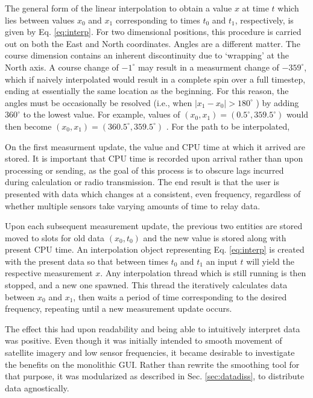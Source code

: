 \documentclass[12pt]{report}
\begin{document}
The general form of the linear interpolation to obtain a value $x$ at time $t$ which lies between values $x_0$ and $x_1$ corresponding to times $t_0$ and $t_1$, respectively, is given by Eq. \ref{eq:interp}.
For two dimensional positions, this procedure is carried out on both the East and North coordinates. 
Angles are a different matter. The course dimension contains an inherent discontinuity due to `wrapping' at the North axis. A course change of $-1^\circ$ may result in a measurment change of $-359^\circ$, which if naively interpolated would result in a complete spin over a full timestep, ending at essentially the same location as the beginning. For this reason, the angles must be occasionally be resolved (i.e., when $|x_1 - x_0| > 180^\circ$ ) by adding $360^\circ$ to the lowest value. For example, values of $(x_0, x_1) = (0.5^\circ, 359.5^\circ)$ would then become $(x_0, x_1) = (360.5^\circ, 359.5^\circ)$ .
For the path to be interpolated, 

On the first measurment update, the value and CPU time at which it arrived are stored. It is important that CPU time is recorded upon arrival rather than upon processing or sending, as the goal of this process is to obscure lags incurred during calculation or radio transmission. The end result is that the user is presented with data which changes at a consistent, even frequency, regardless of whether multiple sensors take varying amounts of time to relay data.

Upon each subsequent measurement update, the previous two entities are stored moved to slots for old data $(x_0, t_0)$ and the new value is stored along with present CPU time. An interpolation object representing Eq. \ref{eq:interp} is created with the present data so that between times $t_0$ and $t_1$ an input $t$ will yield the respective measurement $x$. Any interpolation thread which is still running is then stopped, and a new one spawned. This thread the iteratively calculates data between $x_0$ and $x_1$, then waits a period of time corresponding to the desired frequency, repeating until a new measurement update occurs.

The effect this had upon readability and being able to intuitively interpret data was positive. Even though it was initially intended to smooth movement of satellite imagery and low sensor frequencies, it became desirable to investigate the benefits on the monolithic GUI. Rather than rewrite the smoothing tool for that purpose, it was modularized as described in Sec. \ref{sec:datadiss}, to distribute data agnostically.
\end{document}

